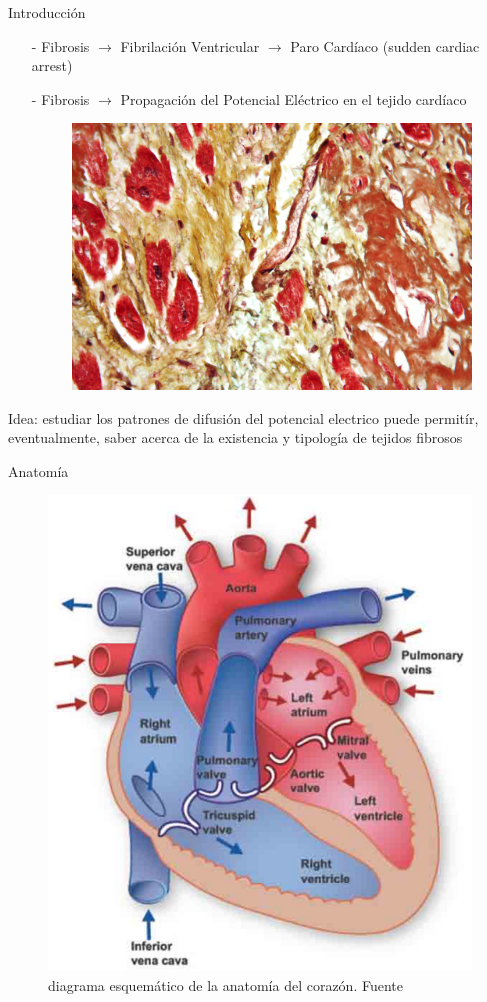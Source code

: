 \documentclass[11pt,spanish]{beamer}
\begin{document}
\begin{frame}{Introducción}
\begin{itemize}
\item[-] Fibrosis \pause $\rightarrow$ Fibrilación Ventricular \pause $\rightarrow$ Paro Cardíaco (sudden cardiac arrest) \pause
\item[-] Fibrosis \pause $\rightarrow$ Propagación del Potencial Eléctrico en el tejido cardíaco \cite{TenTusscher2007Europace}
\begin{figure}
\includegraphics[height = 4 cm]{fig/intro1}
\end{figure}
\end{itemize}
\pause
Idea: estudiar los patrones de difusión del potencial electrico puede permitír, eventualmente, saber acerca de la existencia y tipología de tejidos fibrosos
\end{frame}

\begin{frame}{Anatomía}
\begin{figure}[H] %
\centering
\includegraphics[height = 6 cm]{fig/fundamentals-corazon}
\caption{diagrama esquemático de la anatomía del corazón. Fuente \cite{texas_inst} } \label{corazon}
\end{figure}
\end{frame}
\end{document}
